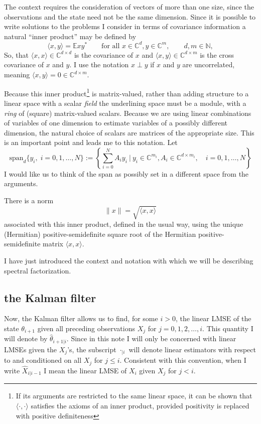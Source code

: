 \documentclass[12pt]{amsart}
\newcommand{\E}{\mathbb{E}}
\newcommand{\C}{\mathbb{C}}
\newcommand{\N}{\mathbb{N}}
\begin{document}
The context requires the consideration of vectors of more than one size, since the observations and the state need not be the same dimension. Since it is possible to write solutions to the problems I consider in terms of covariance information a natural ``inner product'' may be defined by
\begin{equation}
\langle x,y \rangle = \E xy^*\qquad \text{for all }x\in \C^d,y\in \C^m, \qquad d,m \in \N,
\label{def: inner p}
\end{equation}
So, that $\langle x,x \rangle \in \C^{d\times d}$ is the covariance of $x$ and $\langle x,y \rangle \in \C^{d\times m}$ is the cross covariance of $x$ and $y$. I use the notation $x \perp y$ if $x$ and $y$ are uncorrelated, meaning $\langle x,y \rangle = 0 \in \C^{d\times m}$.  

Because this inner product\footnote{
	If its arguments are restricted to the same linear space, it can be shown that $\langle \cdot, \cdot\rangle$ satisfies the axioms of an inner product, provided positivity is replaced with positive definiteness}
is matrix-valued, rather than adding structure to a linear space with a scalar \emph{field} the underlining space must be a module, with a \emph{ring} of (square) matrix-valued scalars. Because we are using linear combinations of variables of one dimension to estimate variables of a possibly different dimension, the natural choice of scalars are matrices of the appropriate size. This is an important point and leads me to this notation.
Let $$\text{span}_d\{y_i,\;i=0,1,\dots,N\} := \left\{\sum_{i=0}^N A_iy_i ~\bigg|~ y_i\in \C^{m_i},A_i \in \C^{d\times m_i},\quad i=0,1,\dots,N\right\}$$
I would like us to think of the span as possibly set in a different space from the arguments.

There is a norm 
\begin{equation}
\|x\|=\sqrt{\langle x,x \rangle}
\label{def: norm}
\end{equation} associated with this inner product, defined in the usual way, using the unique (Hermitian) positive-semidefinite square root of the Hermitian positive-semidefinite matrix $\langle x,x \rangle$.   


I have just introduced the context and notation with which we will be describing spectral factorization. 

\subsection{the Kalman filter}
Now, the Kalman filter allows us to find, for some $i>0$, the linear LMSE of the state $\theta_{i+1}$ given all preceding observations $X_j$ for $j = 0,1,2,\dots, i$. 
This quantity I will denote by $\hat{\theta}_{i+1|i}$. Since in this note I will only be concerned with linear LMSEs given the $X_j$'s, the subscript $\cdot_{|i}$ will denote linear estimators with respect to and conditioned on all $X_j$ for $j \le i$. 
Consistent with this convention, when I write $\hat{X}_{i|i-1}$ I mean the linear LMSE of $X_i$ given $X_j$ for $j < i$. 
\end{document}
